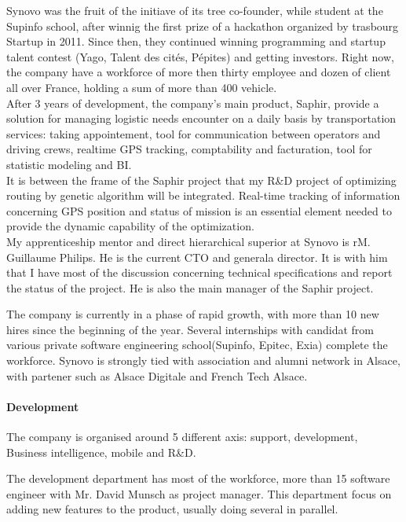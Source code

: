 \documentclass[12pt]{memoir}
\begin{document}
Synovo was the fruit of the initiave of its tree co-founder, while student at the Supinfo school, after winnig the first prize of a hackathon organized by trasbourg Startup in 2011. Since then, they continued winning programming and startup talent contest (Yago, Talent des cités, Pépites) and getting investors. Right now, the company have a workforce of more then thirty employee and dozen of client all over France, holding a sum of more than 400 vehicle. \\
After 3 years of development, the company's main product, Saphir, provide a solution for managing logistic needs encounter on a daily basis by transportation services: taking appointement, tool for communication between operators and driving crews, realtime GPS tracking, comptability and facturation, tool for statistic modeling and BI. \\ 
It is between the frame of the Saphir project that my R\&D project of optimizing routing by genetic algorithm will be integrated. Real-time tracking of information concerning GPS position and status of mission is an essential element needed to provide the dynamic capability of the optimization.\\
My apprenticeship mentor and direct hierarchical  superior at Synovo is rM. Guillaume Philips.
He is the current CTO and generala director. It is with him that I have most of the discussion concerning technical specifications and report the status of the project. He is also the main manager of the Saphir project.

\bigskip
The company is currently in a phase of rapid growth, with more than 10 new hires since the beginning of the year. Several internships with candidat from various private software engineering school(Supinfo, Epitec, Exia) complete the workforce. Synovo is strongly tied with association and alumni network in Alsace, with partener such as Alsace Digitale and French Tech Alsace.

\paragraph{Development }\label{duxe9veloppement}

The company is organised around 5 different axis: support, development, Business intelligence, mobile and R\&D.

The development department has most of the workforce, more than 15 software engineer with Mr. David Munsch as project manager. This department focus on adding new features to the product, usually doing several in parallel.
\end{document}

